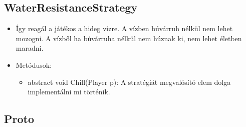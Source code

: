 \subsection{WaterResistanceStrategy}
\begin{itemize}
	\item Így reagál a játékos a hideg vízre. A vízben búvárruh nélkül nem lehet mozogni. A vízből ha búvárruha nélkül nem húznak ki, nem lehet életben maradni.
	\item Metódusok:
	\begin{itemize}
		\item abstract void Chill(Player p): A stratégiát megvalósító elem dolga implementálni mi történik.
	\end{itemize}
\end{itemize}

\subsection{Proto}
